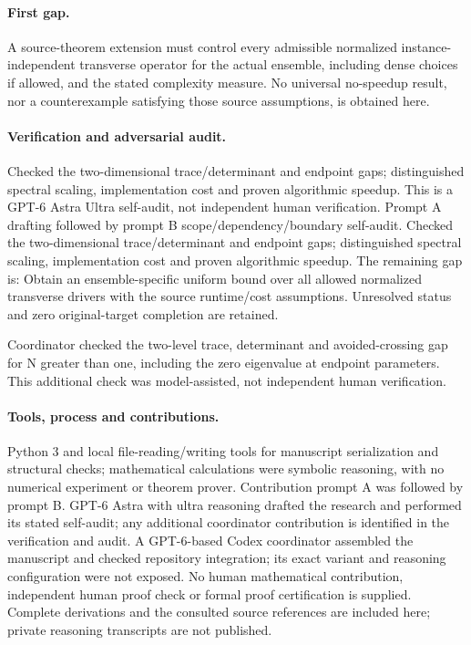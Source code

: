 \documentclass[11pt]{article}
\begin{document}
\paragraph{First gap.} A source-theorem extension must control every admissible normalized instance-independent transverse operator for the actual ensemble, including dense choices if allowed, and the stated complexity measure. No universal no-speedup result, nor a counterexample satisfying those source assumptions, is obtained here.

\paragraph{Verification and adversarial audit.}
Checked the two-dimensional trace/determinant and endpoint gaps; distinguished spectral scaling, implementation cost and proven algorithmic speedup. This is a GPT-6 Astra Ultra self-audit, not independent human verification. Prompt A drafting followed by prompt B scope/dependency/boundary self-audit. Checked the two-dimensional trace/determinant and endpoint gaps; distinguished spectral scaling, implementation cost and proven algorithmic speedup. The remaining gap is: Obtain an ensemble-specific uniform bound over all allowed normalized transverse drivers with the source runtime/cost assumptions. Unresolved status and zero original-target completion are retained.

Coordinator checked the two-level trace, determinant and avoided-crossing gap for N greater than one, including the zero eigenvalue at endpoint parameters. This additional check was model-assisted, not independent human verification.

\paragraph{Tools, process and contributions.}
Python 3 and local file-reading/writing tools for manuscript serialization and structural checks; mathematical calculations were symbolic reasoning, with no numerical experiment or theorem prover. Contribution prompt A was followed by prompt B. GPT-6 Astra with ultra reasoning drafted the research and performed its stated self-audit; any additional coordinator contribution is identified in the verification and audit. A GPT-6-based Codex coordinator assembled the manuscript and checked repository integration; its exact variant and reasoning configuration were not exposed. No human mathematical contribution, independent human proof check or formal proof certification is supplied. Complete derivations and the consulted source references are included here; private reasoning transcripts are not published.
\end{document}
